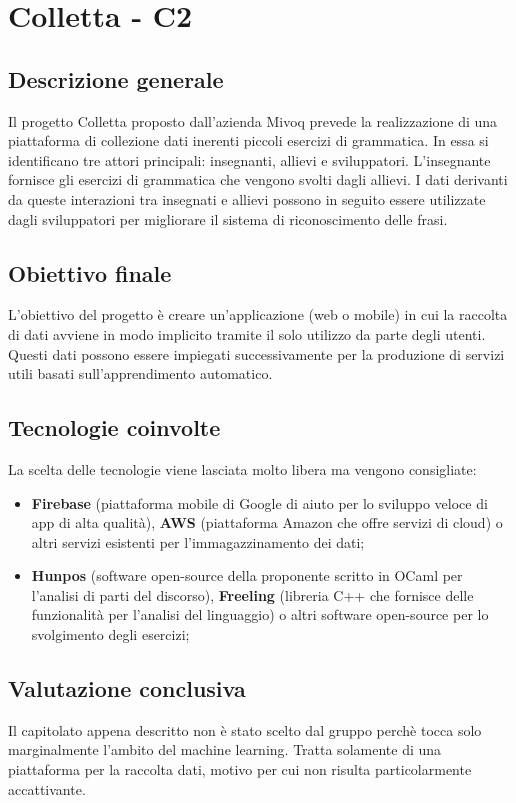 \section{Colletta - C2} \label{c2}
    \subsection{Descrizione generale}
    Il progetto Colletta proposto dall'azienda Mivoq prevede la realizzazione di una piattaforma di collezione dati inerenti piccoli esercizi di grammatica. In essa si identificano tre attori principali: insegnanti, allievi e sviluppatori. L'insegnante fornisce gli esercizi di grammatica che vengono svolti dagli allievi. I dati derivanti da queste interazioni tra insegnati e allievi possono in seguito essere utilizzate dagli sviluppatori per migliorare il sistema di riconoscimento delle frasi.

    \subsection{Obiettivo finale}
    L'obiettivo del progetto è creare un'applicazione (web o mobile) in cui la raccolta di dati avviene in modo implicito tramite il solo utilizzo da parte degli utenti. Questi dati possono essere impiegati successivamente per la produzione di servizi utili basati sull'apprendimento automatico.

    \subsection{Tecnologie coinvolte}
    La scelta delle tecnologie viene lasciata molto libera ma vengono consigliate:
    	\begin{itemize}
    		\item \textbf{Firebase} (piattaforma mobile di Google di aiuto per lo sviluppo veloce di app di alta qualità), \textbf{AWS} (piattaforma Amazon che offre servizi di cloud) o altri servizi esistenti per l'immagazzinamento dei dati;
    		\item \textbf{Hunpos} (software open-source della proponente scritto in OCaml per l'analisi di parti del discorso), \textbf{Freeling} (libreria C++ che fornisce delle funzionalità per l'analisi del linguaggio) o altri software open-source per lo svolgimento degli esercizi;
    	\end{itemize}

    \subsection{Valutazione conclusiva}
    Il capitolato appena descritto non è stato scelto dal gruppo perchè tocca solo marginalmente l'ambito del machine learning. Tratta solamente di una piattaforma per la raccolta dati, motivo per cui non risulta particolarmente accattivante.
